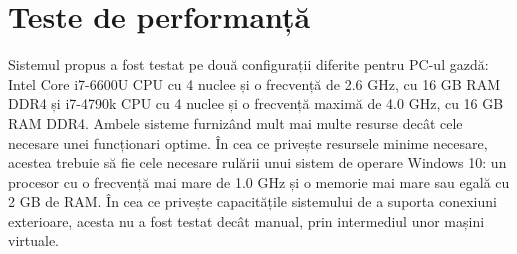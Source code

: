  \section{Teste de performanță}

Sistemul propus a fost testat pe două configurații diferite pentru PC-ul gazdă: Intel Core i7-6600U CPU cu 4 nuclee și o frecvență de 2.6 GHz, cu 16 GB RAM DDR4 și i7-4790k CPU cu 4 nuclee și o frecvență maximă de 4.0 GHz, cu 16 GB RAM DDR4. Ambele sisteme furnizând mult mai multe resurse decât cele necesare unei funcționari optime. În cea ce privește resursele minime necesare, acestea trebuie să fie cele necesare rulării unui sistem de operare Windows 10: un procesor cu o frecvență mai mare de 1.0 GHz și o memorie mai mare sau egală cu 2 GB de RAM. În cea ce privește capacitățile sistemului de a suporta conexiuni exterioare, acesta nu a fost testat decât manual, prin intermediul unor mașini virtuale. 